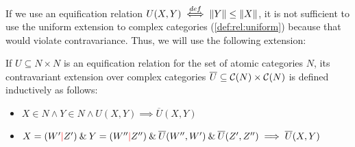 \documentclass[main.tex]{subfiles}
\begin{document}
If we use an equification relation $U(X, Y) \overset{def}{\iff} \|Y\| \leq \|X\|$,
it is not sufficient to use the uniform extension to complex categories
(\cref{def:rel:uniform}) because that would violate contravariance. Thus,
we will use the following extension:
\begin{defn}
    If $U \subseteq N \times N$ is an equification relation
    for the set of
    atomic categories $N$, its contravariant extension over complex categories
    $\overline{U} \subseteq \mathcal{C}( N ) \times \mathcal{C}( N )$ is defined
    inductively as follows:
    \begin{itemize}
        \item $X \in N \land Y \in N \land U(X, Y) \implies \overline{U}(X, Y)$
        \item $X = (W' \textcolor{red}{|} Z') \mathbin{\&} Y = (W'' \textcolor{red}{|} Z'') \mathbin{\&} \overline{U}(W'', W')
        \mathbin{\&} \overline{U}(Z', Z'')\implies \overline{U}(X, Y)$
    \end{itemize}
\end{defn}
\end{document}
